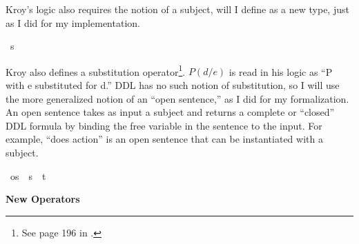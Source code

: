 \begin{isabellebody}
%
\endisatagdocument
{\isafolddocument}%
%
\isadelimdocument
%
\endisadelimdocument
%
\begin{isamarkuptext}%
Kroy's logic also requires the notion of a subject, will I define as a new type, just as I did
for my implementation.%
\end{isamarkuptext}\isamarkuptrue%
\isamarkupfalse%
\ s\ %
%
\begin{isamarkuptext}%
Kroy also defines a substitution operator\footnote{See page 196 in \citet{kroy}.}. 
$P (d/e)$ is read in his logic as ``P with e substituted 
for d.'' DDL has no such notion of substitution, so I will use the more generalized notion of an ``open 
sentence,'' as I did for my formalization. An open sentence takes as input a subject and returns a 
complete or ``closed'' DDL formula by binding the free variable in the sentence to the input. For example, 
``does action'' is an open sentence that can be instantiated with a subject.%
\end{isamarkuptext}\isamarkuptrue%
\isamarkupfalse%
\ os\ {\isacharequal}\ {\isachardoublequoteopen}{\isacharparenleft}s\ {\isasymRightarrow}\ t{\isacharparenright}{\isachardoublequoteclose}\isanewline
%
\isanewline
%
%
\begin{isamarkuptext}%
\noindent \textbf{New Operators}


\end{isamarkuptext}
\end{isabellebody}
